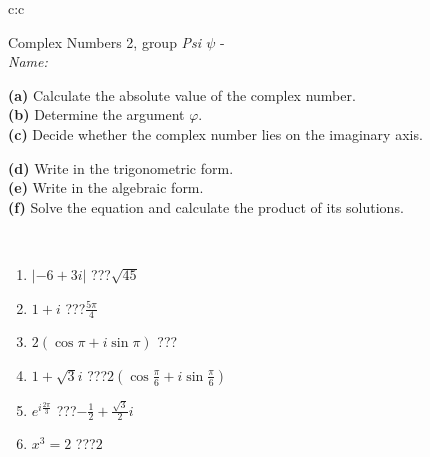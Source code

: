 \documentclass[10pt]{report}
\begin{document}
\newpage
\thispagestyle{empty}
\begin{tabular}{c:c}
\begin{minipage}[c][104.5mm][t]{0.5\linewidth}
\begin{center}
\vspace{5mm}
{\huge Complex Numbers 2, group \textit{Psi $\psi$} -}\\[5mm]
\textit{Name:}\phantom{xxxxxxxxxxxxxxxxxxxxxxxxxxxxxxxxxxxxxxxxxxxxxxxxxxxxxxxxxxxxxxxxx}\\[5mm]
\begin{minipage}{0.95\linewidth}
\begin{center}
{\small \begin{minipage}{0.44\textwidth} \raggedright
\textbf{(a)} Calculate the absolute value of the complex number. \\[1mm]
\textbf{(b)} Determine the argument \(\varphi\). \\[1mm]
\textbf{(c)} Decide whether the complex number lies on the imaginary axis. \end{minipage} \begin{minipage}{0.54\textwidth}
\textbf{(d)} Write in the trigonometric form. \\[1mm]
\textbf{(e)} Write in the algebraic form. \\[1mm]
\textbf{(f)} Solve the equation and calculate the product of its solutions.
\end{minipage}
}
\end{center}
\end{minipage}
\\[1mm]
\begin{minipage}{0.79\linewidth}
\begin{center}
\begin{varwidth}{\linewidth}
\setlength{\itemsep}{0pt}
\begin{enumerate}
\large
\item $|-6+3i|$\quad \dotfill\; ???\;\dotfill \quad $\sqrt{45}$
\item $1+i$\quad \dotfill\; ???\;\dotfill \quad $\frac{5\pi}{4}$
\item $2\left(\cos{\pi}+i\sin{\pi}\right)$\quad \dotfill\; ???\;\dotfill \quad {}
\item $1+\sqrt{3}i$\quad \dotfill\; ???\;\dotfill \quad $2\left(\cos{\frac{\pi}{6}}+i\sin{\frac{\pi}{6}}\right)$
\item $e^{i\frac{2\pi}{3}}$\quad \dotfill\; ???\;\dotfill \quad $-\frac{1}{2}+\frac{ \sqrt{3}}{2}i$
\item $x^3=2$\quad \dotfill\; ???\;\dotfill \quad $2$

\end{enumerate}
\end{varwidth}
\end{center}
\end{minipage}
\end{center}
\end{minipage}
\end{tabular}
\end{document}
